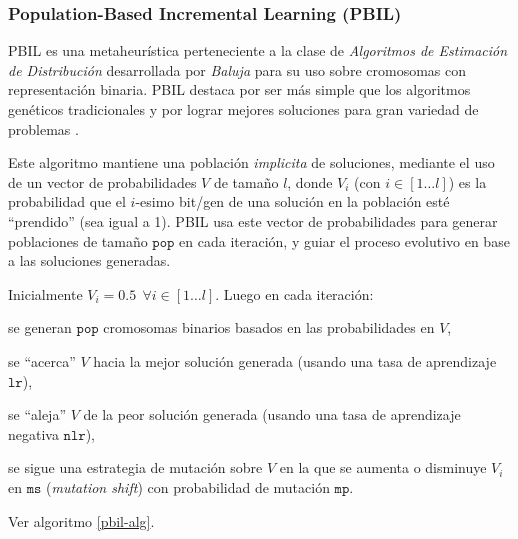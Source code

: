 \subsubsection{Population-Based Incremental Learning (PBIL)}

PBIL es una metaheurística perteneciente a la clase de \emph{Algoritmos de Estimación de Distribución} desarrollada por \emph{Baluja} \cite{Baluja94pbil} para su uso sobre cromosomas con representación binaria. PBIL destaca por ser más simple que los algoritmos genéticos tradicionales y por lograr mejores soluciones para gran variedad de problemas \cite{Baluja95anempirical,Baluja95removingthe}.

Este algoritmo mantiene una población \emph{implicita} de soluciones, mediante el uso de un vector de probabilidades $V$ de tamaño $l$, donde $V_i$ (con $i \in [1 \dots l]$) es la probabilidad que el $i$-esimo bit/gen de una solución en la población esté ``prendido'' (sea igual a 1). PBIL usa este vector de probabilidades para generar poblaciones de tamaño $\texttt{pop}$ en cada iteración, y guiar el proceso evolutivo en base a las soluciones generadas.

Inicialmente $V_i = 0.5\ \ \forall{i \in [1\dots l]}$. Luego en cada iteración:
\begin{inparaenum}
\item se generan $\texttt{pop}$ cromosomas binarios basados en las probabilidades en $V$,
\item se ``acerca'' $V$ hacia la mejor solución generada (usando una tasa de aprendizaje $\texttt{lr}$), 
\item se ``aleja'' $V$ de la peor solución generada (usando una tasa de aprendizaje negativa $\texttt{nlr}$),
\item se sigue una estrategia de mutación sobre $V$ en la que se aumenta o disminuye $V_i$ en $\texttt{ms}$ (\emph{mutation shift}) con probabilidad de mutación $\texttt{mp}$.
\end{inparaenum}
Ver algoritmo \ref{pbil-alg}.

